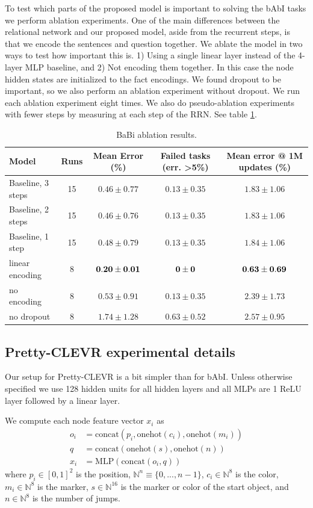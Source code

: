 To test which parts of the proposed model is important to solving the bAbI tasks we perform ablation experiments. One of the main differences between the relational network and our proposed model, aside from the recurrent steps, is that we encode the sentences and question together. We ablate the model in two ways to test how important this is. 1) Using a single linear layer instead of the 4-layer MLP baseline, and 2) Not encoding them together. In this case the node hidden states are initialized to the fact encodings. We found dropout to be important, so we also perform an ablation experiment without dropout. We run each ablation experiment eight times. We also do pseudo-ablation experiments with fewer steps by measuring at each step of the RRN. See table \ref{table:babi-ablate}.

\begin{table}[!ht]
\begin{centering}
  \begin{tabular}{lcccc}
  Model & Runs & Mean Error (\%) & Failed tasks (err. \textgreater 5\%) & Mean error @ 1M updates (\%)\\  
  \midrule
  Baseline, 3 steps & 15 & $0.46 \pm 0.77$ & $0.13 \pm 0.35$ & $1.83 \pm 1.06$ \\
  Baseline, 2 steps & 15 & $0.46 \pm 0.76$ & $0.13 \pm 0.35$ & $1.83 \pm 1.06$ \\
  Baseline, 1 step & 15 & $0.48 \pm 0.79$ & $0.13 \pm 0.35$ & $1.84 \pm 1.06$ \\
  linear encoding & 8 & $\bf{0.20 \pm 0.01}$ & $\bf{0 \pm 0}$ & $\bf{0.63 \pm 0.69}$ \\
  no encoding & 8 & $0.53 \pm 0.91$ & $0.13 \pm 0.35$ & $2.39 \pm 1.73$ \\
  no dropout & 8 & $1.74 \pm 1.28$ & $0.63 \pm 0.52$ & $2.57 \pm 0.95$
  \end{tabular}
  \caption{BaBi ablation results. \label{table:babi-ablate}}
  \end{centering}
\end{table}

\subsection{Pretty-CLEVR experimental details}
Our setup for Pretty-CLEVR is a bit simpler than for bAbI. Unless otherwise specified we use 128 hidden units for all hidden layers and all MLPs are 1 ReLU layer followed by a linear layer.

We compute each node feature vector $x_i$ as
\begin{align*}
o_i &= \text{concat}(p_i, \text{onehot}(c_i), \text{onehot}(m_i)) \\
q &= \text{concat}(\text{onehot}(s), \text{onehot}(n)) \\
x_i &= \text{MLP}(\text{concat}(o_i, q))
\end{align*}
where 
$p_i \in [0,1]^2$ is the position, 
$\mathbb{N}^n \equiv \{0,...,n-1\}$, 
$c_i \in \mathbb{N}^8$ is the color, 
$m_i \in \mathbb{N}^8$ is the marker, 
$s \in \mathbb{N}^{16}$ is the marker or color of the start object, and 
$n \in \mathbb{N}^8$ is the number of jumps.

